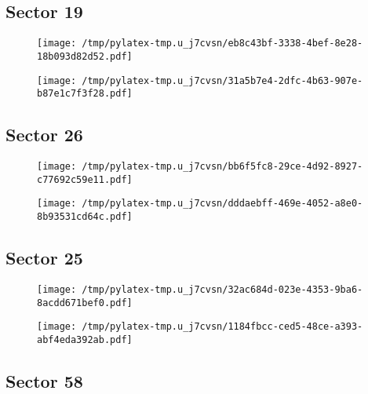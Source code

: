 \documentclass{report}%
\begin{document}
%
\subsection{Sector 19}%
\label{subsec:40298066419}%


\begin{figure}[H]%
\centering%
\centering%
\texttt{[image: /tmp/pylatex-tmp.u\_j7cvsn/eb8c43bf-3338-4bef-8e28-18b093d82d52.pdf]}%
\end{figure}

%


\begin{figure}[H]%
\centering%
\texttt{[image: /tmp/pylatex-tmp.u\_j7cvsn/31a5b7e4-2dfc-4b63-907e-b87e1c7f3f28.pdf]}%
\end{figure}

%
\subsection{Sector 26}%
\label{subsec:40298066426}%


\begin{figure}[H]%
\centering%
\centering%
\texttt{[image: /tmp/pylatex-tmp.u\_j7cvsn/bb6f5fc8-29ce-4d92-8927-c77692c59e11.pdf]}%
\end{figure}

%


\begin{figure}[H]%
\centering%
\texttt{[image: /tmp/pylatex-tmp.u\_j7cvsn/dddaebff-469e-4052-a8e0-8b93531cd64c.pdf]}%
\end{figure}

%
\subsection{Sector 25}%
\label{subsec:40298066425}%


\begin{figure}[H]%
\centering%
\centering%
\texttt{[image: /tmp/pylatex-tmp.u\_j7cvsn/32ac684d-023e-4353-9ba6-8acdd671bef0.pdf]}%
\end{figure}

%


\begin{figure}[H]%
\centering%
\texttt{[image: /tmp/pylatex-tmp.u\_j7cvsn/1184fbcc-ced5-48ce-a393-abf4eda392ab.pdf]}%
\end{figure}

%
\subsection{Sector 58}%
\label{subsec:40298066458}%
\end{document}

